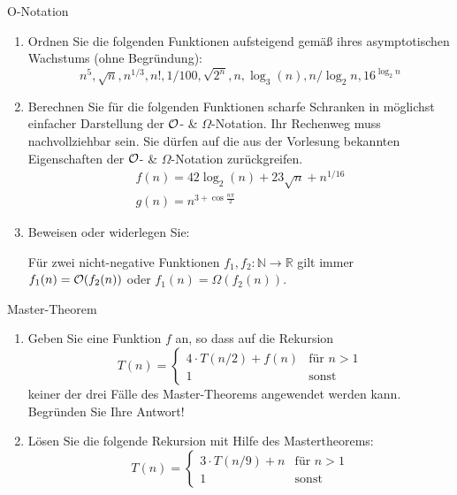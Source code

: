 \documentclass{article}
\begin{document}
\begin{exercise}{O-Notation}
  \begin{enumerate}
    \item Ordnen Sie die folgenden Funktionen aufsteigend gemäß ihres asymptotischen Wachstums (ohne Begründung):
          \begin{equation*}
            n^5,\sqrt{n},n^{1/3},n!,1/100,\sqrt{2^n},n,\log_3(n),n/\log_2{n},16^{\log_2{n}}
          \end{equation*}
    \item Berechnen Sie für die folgenden Funktionen scharfe Schranken in möglichst einfacher Darstellung der $\mathcal{O}$- \& $\Omega$-Notation. Ihr Rechenweg muss nachvollziehbar sein. Sie dürfen auf die aus der Vorlesung bekannten Eigenschaften der $\mathcal{O}$- \& $\Omega$-Notation zurückgreifen.
          \begin{align*}
            f(n) = 42\log_2(n) + 23\sqrt{n} + n^{1/16} \\
            g(n) = n^{3+\cos{\frac{n\pi}{2}}}
          \end{align*}
    \item Beweisen oder widerlegen Sie:\par Für zwei nicht-negative Funktionen $f_1, f_2: \mathbb{N} \to \mathbb{R}$ gilt immer $f_1(n) = \mathcal{O}(f_2(n))$ oder $f_1(n) = \Omega(f_2(n))$.
  \end{enumerate}
\end{exercise}

\begin{exercise}{Master-Theorem}
  \begin{enumerate}
    \item Geben Sie eine Funktion $f$ an, so dass auf die Rekursion
          \begin{equation*}
            T(n) = \begin{cases}
              4\cdot T(n/2) + f(n) & \text{für } n > 1 \\
              1                    & \text{sonst}
            \end{cases}
          \end{equation*}
          keiner der drei Fälle des Master-Theorems angewendet werden kann. Begründen Sie Ihre Antwort!
    \item Lösen Sie die folgende Rekursion mit Hilfe des Mastertheorems:
          \begin{equation*}
            T(n) = \begin{cases}
              3\cdot T(n/9) + n & \text{für } n > 1 \\
              1                 & \text{sonst}
            \end{cases}
          \end{equation*}
  \end{enumerate}
\end{exercise}
\end{document}
